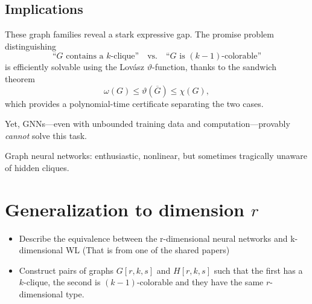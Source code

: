 \subsection{Implications}

These graph families reveal a stark expressive gap. The promise problem distinguishing
\[
\text{``$G$ contains a $k$-clique''} \quad \text{vs.} \quad \text{``$G$ is $(k-1)$-colorable''}
\]
is efficiently solvable using the Lovász $\vartheta$-function, thanks to the sandwich theorem
\[
\omega(G) \le \vartheta(\overline{G}) \le \chi(G),
\]
which provides a polynomial-time certificate separating the two cases.

Yet, GNNs---even with unbounded training data and computation---provably \emph{cannot} solve this task.

Graph neural networks: enthusiastic, nonlinear, but sometimes tragically unaware of hidden cliques.



\section{Generalization to dimension $r$}

\begin{itemize}
    \item Describe the equivalence between the r-dimensional neural networks and k-dimensional WL (That is from one of the shared papers)

    \item Construct pairs of graphs $G[r,k,s]$ and $H[r,k,s]$ such that the first has a $k$-clique, the second is $(k-1)$-colorable and they have the same $r$-dimensional type. 
\end{itemize}